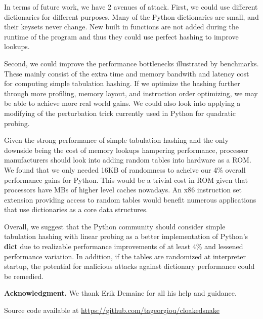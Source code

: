 \documentclass[runningheads,a4paper]{llncs}
\begin{document}

In terms of future work, we have 2 avenues of attack. First, we could use
different dictionaries for different purposes. Many of the Python dictionaries
are small, and their keysets never change. New built in functions are not added
during the runtime of the program and thus they could use perfect hashing to improve lookups.

Second, we could improve the performance bottlenecks illustrated by benchmarks.
These mainly consist of the extra time and memory bandwith and latency cost for
computing simple tabulation hashing.  If we optimize the hashing further
through more profiling, memory layout, and instruction order optimizing, we may
be able to achieve more real world gains.  We could also look into applying a
modifying of the perturbation trick currently used in Python for quadratic
probing.

Given the strong performance of simple tabulation hashing and the only downside
being the cost of memory lookups hampering performance, processor manufacturers should look into
adding random tables into hardware as a ROM.  We found that we only needed 16KB of randomness to acheive our 4\% overall performance gains for Python. This would be a trivial
cost in ROM given that processors have MBs of higher level caches nowadays.  An x86 instruction set extension providing access to random tables would benefit numerous applications that use dictionaries as a core data structures.

Overall, we suggest that the Python community should consider simple tabulation hashing with linear probing as a better implementation of Python's \textbf{dict} due to realizable performance improvements of at least 4\% and lessened performance variation.  In addition, if the tables are randomized at interpreter startup, the potential for malicious attacks against dictionary performance could be remedied.


\vspace{0.2in}


\textbf{Acknowledgment.} We thank Erik Demaine for all his help and guidance. 


\vspace{0.2in}


Source code available at \url{https://github.com/tageorgiou/cloakedsnake}


{}

\end{document}
